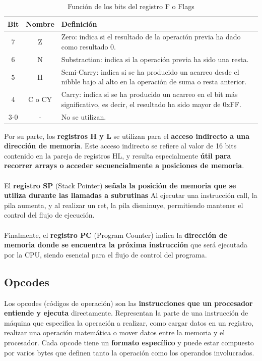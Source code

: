 \begin{table}[H]
    \centering
    \begin{tabular}{|c|c|>{\centering\arraybackslash}p{9cm}|}
        \hline
        \textbf{Bit} & \textbf{Nombre} & \textbf{Definición} \\
        \hline
        7 & Z & Zero: indica si el resultado de la operación previa ha dado como resultado 0. \\
        \hline
        6 & N & Substraction: indica si la operación previa ha sido una resta. \\
        \hline
        5 & H & Semi-Carry: indica si se ha producido un acarreo desde el nibble bajo al alto en la operación de suma o resta anterior. \\
        \hline
        4 & C o CY & Carry: indica si se ha producido un acarreo en el bit más significativo, es decir, el resultado ha sido mayor de 0xFF. \\
        \hline
        3-0 & - & No se utilizan. \\
        \hline
    \end{tabular}
    \caption{Función de los bits del registro F o Flags}
\end{table}

\clearpage

Por su parte, los \textbf{registros H y L} se utilizan para el \textbf{acceso indirecto a una dirección de memoria}. Este acceso indirecto se refiere al valor de 16 bits contenido en la pareja de registros HL, y resulta especialmente \textbf{útil para recorrer arrays o acceder secuencialmente a posiciones de memoria}.
\\\\
El \textbf{registro SP} (Stack Pointer) \textbf{señala la posición de memoria que se utiliza durante las llamadas a subrutinas} Al ejecutar una instrucción call, la pila aumenta, y al realizar un ret, la pila disminuye, permitiendo mantener el control del flujo de ejecución.
\\\\
Finalmente, el \textbf{registro PC} (Program Counter) indica la \textbf{dirección de memoria donde se encuentra la próxima instrucción} que será ejecutada por la CPU, siendo esencial para el flujo de control del programa.

\subsection{Opcodes}

Los opcodes (códigos de operación) son las \textbf{instrucciones que un procesador entiende y ejecuta} directamente. Representan la parte de una instrucción de máquina que especifica la operación a realizar, como cargar datos en un registro, realizar una operación matemática o mover datos entre la memoria y el procesador. Cada opcode tiene un \textbf{formato específico} y puede estar compuesto por varios bytes que definen tanto la operación como los operandos involucrados.

